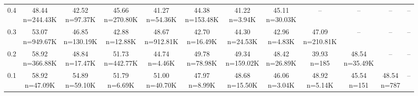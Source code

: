\begin{table}
\begin{tabular}{lccccccccccc}
0.4 & \makecell{48.44 \\ \scriptsize n=244.43K} & \makecell{42.52 \\ \scriptsize n=97.37K} & \makecell{45.66 \\ \scriptsize n=270.80K} & \makecell{41.27 \\ \scriptsize n=54.36K} & \makecell{44.38 \\ \scriptsize n=153.48K} & \makecell{41.22 \\ \scriptsize n=3.94K} & \makecell{45.11 \\ \scriptsize n=30.03K} & -- & -- & -- & -- \\
0.3 & \makecell{53.07 \\ \scriptsize n=949.67K} & \makecell{46.85 \\ \scriptsize n=130.19K} & \makecell{42.88 \\ \scriptsize n=12.88K} & \makecell{48.67 \\ \scriptsize n=912.81K} & \makecell{42.70 \\ \scriptsize n=16.49K} & \makecell{44.30 \\ \scriptsize n=24.53K} & \makecell{42.96 \\ \scriptsize n=4.83K} & \makecell{47.09 \\ \scriptsize n=210.81K} & -- & -- & -- \\
0.2 & \makecell{58.92 \\ \scriptsize n=366.88K} & \makecell{48.84 \\ \scriptsize n=17.47K} & \makecell{51.73 \\ \scriptsize n=442.77K} & \makecell{44.74 \\ \scriptsize n=4.46K} & \makecell{49.78 \\ \scriptsize n=78.98K} & \makecell{49.34 \\ \scriptsize n=159.02K} & \makecell{48.42 \\ \scriptsize n=26.89K} & \makecell{39.93 \\ \scriptsize n=185} & \makecell{48.54 \\ \scriptsize n=35.49K} & -- & -- \\
0.1 & \makecell{58.92 \\ \scriptsize n=47.09K} & \makecell{54.89 \\ \scriptsize n=59.10K} & \makecell{51.79 \\ \scriptsize n=6.69K} & \makecell{51.00 \\ \scriptsize n=40.70K} & \makecell{47.97 \\ \scriptsize n=8.99K} & \makecell{48.68 \\ \scriptsize n=15.50K} & \makecell{46.06 \\ \scriptsize n=3.04K} & \makecell{48.92 \\ \scriptsize n=5.14K} & \makecell{45.54 \\ \scriptsize n=151} & \makecell{48.54 \\ \scriptsize n=787} & -- \\

\end{tabular}
\end{table}
